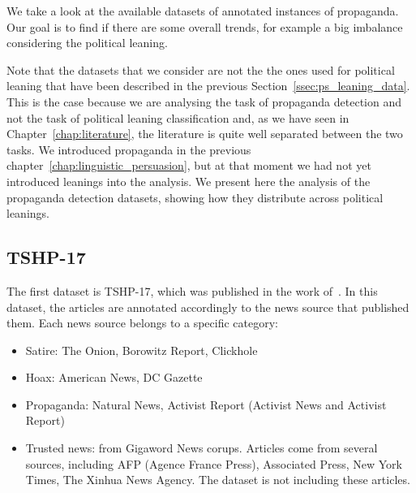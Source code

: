 



We take a look at the available datasets of annotated instances of propaganda.
Our goal is to find if there are some overall trends, for example a big imbalance considering the political leaning.

Note that the datasets that we consider are not the the ones used for political leaning that have been described in the previous Section~\ref{ssec:ps_leaning_data}.
This is the case because we are analysing the task of propaganda detection and not the task of political leaning classification and, as we have seen in Chapter~\ref{chap:literature}, the literature is quite well separated between the two tasks.
We introduced propaganda in the previous chapter~\ref{chap:linguistic_persuasion}, but at that moment we had not yet introduced leanings into the analysis.
We present here the analysis of the propaganda detection datasets, showing how they distribute across political leanings.



\subsection{TSHP-17}

The first dataset is TSHP-17, which was published in the work of~\citet{rashkin2017truth}. In this dataset, the articles are annotated accordingly to the news source that published them. Each news source belongs to a specific category:
\begin{itemize}
    \item Satire: The Onion, Borowitz Report, Clickhole
    \item Hoax: American News, DC Gazette
    \item Propaganda: Natural News, Activist Report (Activist News and Activist Report)
    \item Trusted news: from Gigaword News corups. Articles come from several sources, including AFP (Agence France Press), Associated Press, New York Times, The Xinhua News Agency. The dataset is not including these articles.
\end{itemize}

